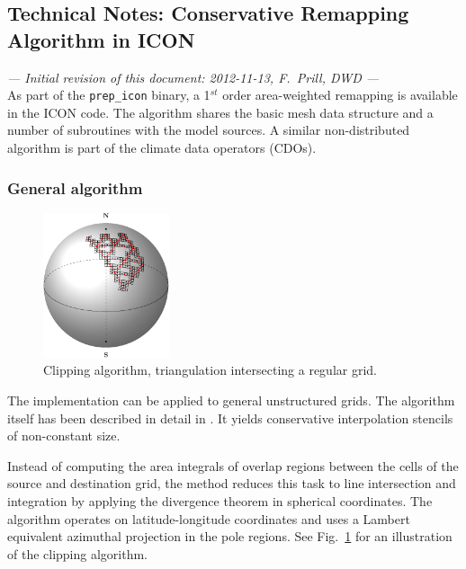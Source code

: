 \documentclass[a4paper,10pt, DIV14]{scrartcl}
\begin{document}
\subsection*{Technical Notes: Conservative Remapping Algorithm in ICON}

\emph{--- Initial revision of this document: 2012-11-13, F.\ Prill, DWD ---}\\

As part of the \texttt{prep\_icon} binary, a 1$^{st}$ order area-weighted remapping
is available in the ICON code.
The algorithm shares the basic mesh data structure and a number of subroutines with the 
model sources.
A similar non-distributed algorithm is part of the climate data operators (CDOs).


\subsubsection*{General algorithm}

\begin{figure}
 \begin{center}
  \includegraphics[width=0.33\textwidth]{remap_intersect.pdf}
 \end{center}
 \setcaphanging
 \setcapindent*{2em}
 \caption{Clipping algorithm, triangulation intersecting a regular grid.}
 \label{fig:intersection}
\end{figure}

The implementation can be applied to general unstructured grids. 
The algorithm itself has been described in detail in \cite{Jones1999}.
It yields conservative interpolation stencils of non-constant size.

Instead of computing the area integrals of overlap regions between the cells of the
source and destination grid, the method reduces this task to line
intersection and integration by applying the divergence theorem in spherical coordinates.
The algorithm operates on latitude-longitude coordinates and uses a
Lambert equivalent azimuthal projection in the pole regions.
See Fig.~\ref{fig:intersection} for an illustration of the clipping algorithm.
\end{document}
